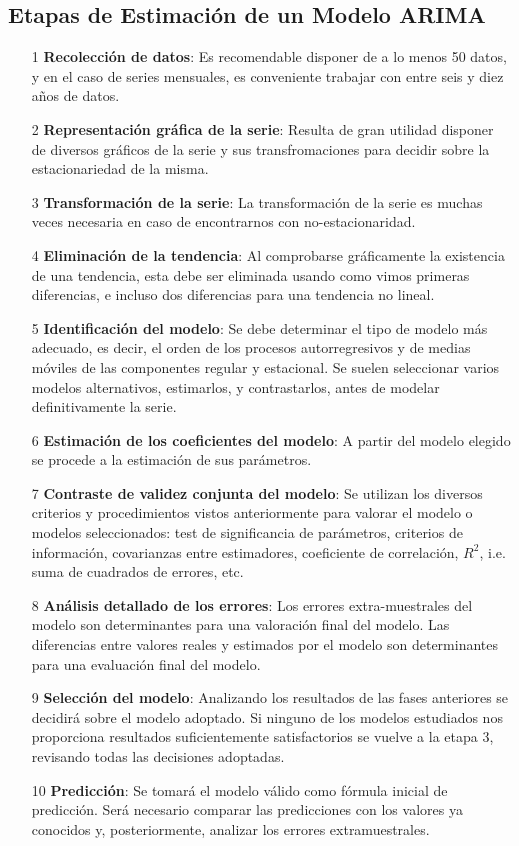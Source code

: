 \subsection{Etapas de Estimaci\'on de un Modelo ARIMA}

\begin{itemize}
\item[1] \textbf{Recolecci\'on de datos}: Es recomendable disponer de a lo menos 50 datos, y en el caso de series mensuales, es conveniente trabajar con entre seis y diez a\~nos de datos.
\item[2] \textbf{Representaci\'on gr\'afica de la serie}: Resulta de gran utilidad disponer de diversos gr\'aficos de la serie y sus transfromaciones para decidir sobre la estacionariedad de la misma.
\item[3] \textbf{Transformaci\'on de la serie}: La transformaci\'on de la serie es muchas veces necesaria en caso de encontrarnos con no-estacionaridad.
\item[4] \textbf{Eliminaci\'on de la tendencia}: Al comprobarse gr\'aficamente la existencia de una tendencia, esta debe ser eliminada usando como vimos primeras diferencias, e incluso dos diferencias para una tendencia no lineal.
\item[5] \textbf{Identificaci\'on del modelo}: Se debe determinar el tipo de modelo m\'as adecuado, es decir, el orden de los procesos autorregresivos y de medias m\'oviles de las componentes regular y estacional. Se suelen seleccionar varios modelos alternativos, estimarlos, y contrastarlos, antes de modelar definitivamente la serie.
\item[6] \textbf{Estimaci\'on de los coeficientes del modelo}: A partir del modelo elegido se procede a la estimaci\'on de sus par\'ametros.
\item[7] \textbf{Contraste de validez conjunta del modelo}: Se utilizan los diversos criterios y procedimientos vistos anteriormente para valorar el modelo o modelos seleccionados: test de significancia de par\'ametros, criterios de informaci\'on, covarianzas entre estimadores, coeficiente de correlaci\'on, $R^2$, i.e. suma de cuadrados de errores, etc.
\item[8] \textbf{An\'alisis detallado de los errores}: Los errores extra-muestrales del modelo son determinantes para una valoraci\'on final del modelo. Las diferencias entre valores reales y estimados por el modelo son determinantes para una evaluaci\'on final del modelo.
\item[9] \textbf{Selecci\'on del modelo}: Analizando los resultados de las fases anteriores se decidir\'a sobre el modelo adoptado. Si ninguno de los modelos estudiados nos proporciona resultados suficientemente satisfactorios se vuelve a la etapa 3, revisando todas las decisiones adoptadas.
\item[10] \textbf{Predicci\'on}: Se tomar\'a el modelo v\'alido como f\'ormula inicial de predicci\'on. Ser\'a necesario comparar las predicciones con los valores ya conocidos y, posteriormente, analizar los errores extramuestrales.
\end{itemize}
%
%


